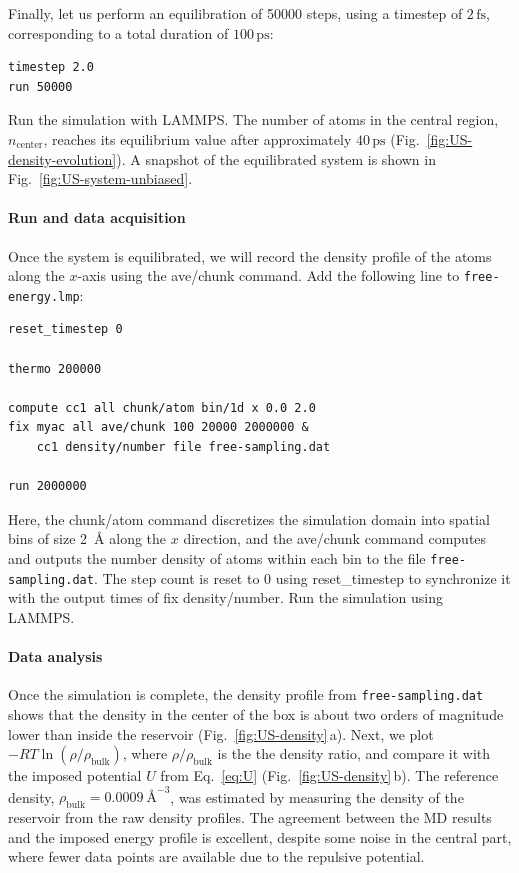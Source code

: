 \documentclass[9pt,tutorial]{livecoms}
\newcommand{\lmpcmd}[1]{\hspace{0pt}\colorbox{listing}{\textcolor{command}{\small{#1}}}\hspace{0pt}} %
\newcommand{\flecmd}[1]{\textcolor{command}{\texttt{#1}}} %
\begin{document}
Finally, let us perform an equilibration of 50000 steps,
using a timestep of $2\,\text{fs}$, corresponding to a total duration of $100\,\text{ps}$:
\begin{lstlisting}
timestep 2.0
run 50000
\end{lstlisting}
Run the simulation with LAMMPS.  The number of atoms in the
central region, $n_\mathrm{center}$, reaches its equilibrium value after approximately $40\,\text{ps}$
(Fig.~\ref{fig:US-density-evolution}).  A snapshot of the equilibrated system is shown in Fig.~\ref{fig:US-system-unbiased}.

\paragraph{Run and data acquisition}

Once the system is equilibrated, we will record the density profile of
the atoms along the $x$-axis using the \lmpcmd{ave/chunk} command.
Add the following line to \flecmd{free-energy.lmp}:
\begin{lstlisting}
reset_timestep 0

thermo 200000

compute cc1 all chunk/atom bin/1d x 0.0 2.0
fix myac all ave/chunk 100 20000 2000000 &
    cc1 density/number file free-sampling.dat

run 2000000
\end{lstlisting}
{\color{blue}Here, the \lmpcmd{chunk/atom} command discretizes the simulation
domain into spatial bins of size 2~\AA{} along the $x$ direction,
and the \lmpcmd{ave/chunk} command computes and outputs the number density of
atoms within each bin to the file \flecmd{free-sampling.dat}.}
The step count is reset to 0 using \lmpcmd{reset\_timestep} to synchronize it
with the output times of \lmpcmd{fix density/number}.  Run the simulation using
LAMMPS.

\paragraph{Data analysis}

Once the simulation is complete, the density profile from \flecmd{free-sampling.dat}
shows that the density in the center of the box is
about two orders of magnitude lower than inside the reservoir (Fig.~\ref{fig:US-density}\,a).
Next, we plot $-R T \ln(\rho/\rho_\mathrm{bulk})$, %
{\color{blue} where $\rho/\rho_\mathrm{bulk}$ is the the density ratio,}
and compare it
with the imposed potential $U$ from Eq.~\eqref{eq:U} (Fig.~\ref{fig:US-density}\,b).
The reference density, $\rho_\text{bulk} = 0.0009~\text{\AA{}}^{-3}$,
was estimated by measuring the density of the reservoir from the raw density
profiles.  The agreement between the MD results and the imposed energy profile
is excellent, despite some noise in the central part, where fewer data points
are available due to the repulsive potential.
\end{document}
